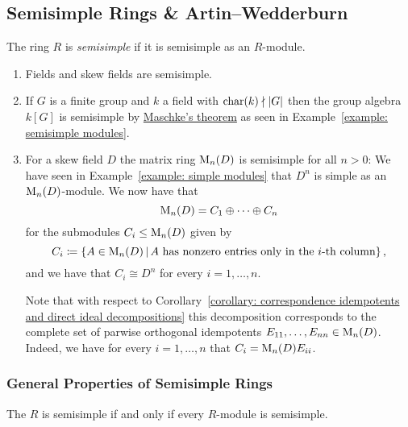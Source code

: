 \subsection{Semisimple Rings \& Artin--Wedderburn}


\begin{definition}
  The ring $R$ is \emph{semisimple} if it is semisimple as an $R$-module.
\end{definition}


\begin{example}
  \label{example: semisimple rings}
  \leavevmode
  \begin{enumerate}
    \item
      Fields and skew fields are semisimple.
    \item
      If $G$ is a finite group and $k$ a field with $\operatorname{char}(k) \nmid |G|$ then the group algebra $k[G]$ is semisimple by \hyperref[theorem: maschkes theorem]{Maschke’s theorem} as seen in Example~\ref{example: semisimple modules}.
    \item
      For a skew field $D$ the matrix ring $\operatorname{M}_n(D)$ is semisimple for all $n > 0$:
      We have seen in Example~\ref{example: simple modules} that $D^n$ is simple as an $\operatorname{M}_n(D)$-module.
      We now have that
      \[
          \operatorname{M}_n(D)
        = C_1 \oplus \dotsb \oplus C_n
      \]
      for the submodules $C_i \leq \operatorname{M}_n(D)$ given by 
      \[
                  C_i
        \defined  \{
                    A \in \Mat_n(D)
                  \suchthat
                    \text{$A$ has nonzero entries only in the $i$-th column}
                  \} \,,
      \]
      and we have that $C_i \cong D^n$ for every $i = 1, \dotsc, n$.
      
      Note that with respect to Corollary~\ref{corollary: correspondence idempotents and direct ideal decompositions} this decomposition corresponds to the complete set of parwise orthogonal idempotents $E_{11}, \dotsc, E_{nn} \in \operatorname{M}_n(D)$.
      Indeed, we have for every $i = 1, \dotsc, n$ that $C_i = \operatorname{M}_n(D) E_{ii}$.
  \end{enumerate}
\end{example}





\subsubsection{General Properties of Semisimple Rings}


\begin{proposition}
  The $R$ is semisimple if and only if every $R$-module is semisimple.
\end{proposition}


